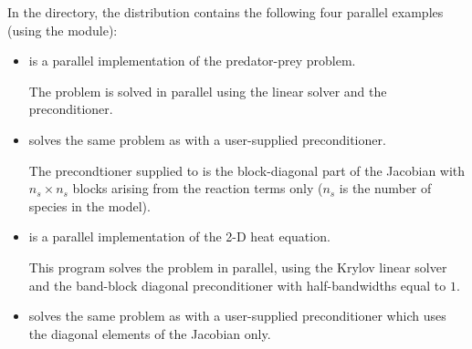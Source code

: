 In the  directory, the {\ida} 
distribution contains the following four parallel examples 
(using the {\nvecp} module):
\begin{itemize}

\item {}
  is a parallel implementation of the predator-prey problem.

  The problem is solved in parallel using the {\idaspgmr} linear
  solver and the {\idabbdpre} preconditioner.

\item {}
  solves the same problem as  with a user-supplied preconditioner.
  
  The precondtioner supplied to {\idaspgmr} is the block-diagonal part of 
  the Jacobian with $n_s \times n_s$ blocks arising from the reaction terms only
  ($n_s$ is the number of species in the model).

\item {}
  is a parallel implementation of the 2-D heat equation.

  This program solves the problem in parallel, using the Krylov linear solver
  {\idaspgmr} and the band-block diagonal preconditioner {\idabbdpre} with
  half-bandwidths equal to $1$.

\item {}
  solves the same problem as  with a user-supplied preconditioner
  which uses the diagonal elements of the Jacobian only.
  
\end{itemize}

